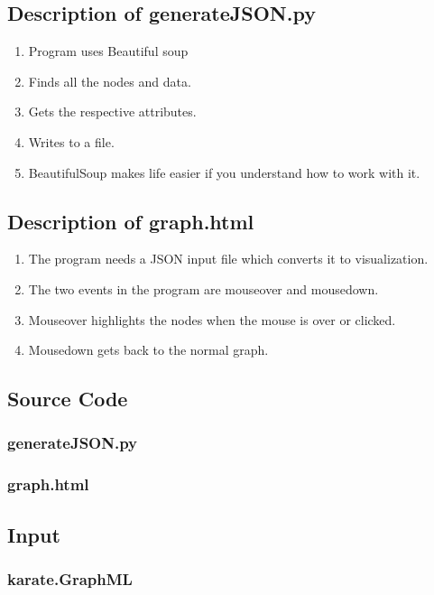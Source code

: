 \documentclass[12pt]{article}
\begin{document}
\subsection{Description of generateJSON.py}
\begin{enumerate}
    \item Program uses Beautiful soup
    \item Finds all the nodes and data.
    \item Gets the respective attributes.
    \item Writes to a file.
    \item BeautifulSoup makes life easier if you understand how to work with it.         
\end{enumerate}
\subsection{Description of graph.html}
\begin{enumerate}
    \item The program needs a JSON input file which converts it to visualization.
    \item The two events in the program are mouseover and mousedown.
    \item Mouseover highlights the nodes when the mouse is over or clicked.
    \item Mousedown gets back to the normal graph.
\end{enumerate}
 \newpage
\subsection{Source Code}
\subsubsection{generateJSON.py}

\newpage
\subsubsection{graph.html}

\newpage
\subsection{Input}
\subsubsection{karate.GraphML}

\newpage
\end{document}
